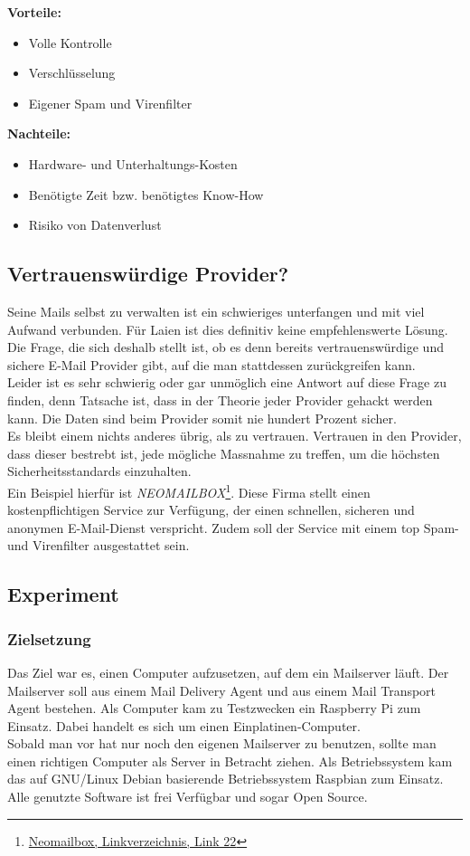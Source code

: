 \textbf{Vorteile:}
\begin{itemize}
    \item Volle Kontrolle
    \item Verschlüsselung
    \item Eigener Spam und Virenfilter
\end{itemize}

\textbf{Nachteile:}
\begin{itemize}
    \item Hardware- und Unterhaltungs-Kosten
    \item Benötigte Zeit bzw. benötigtes Know-How
    \item Risiko von Datenverlust
\end{itemize}

\subsection{Vertrauenswürdige Provider?}
Seine Mails selbst zu verwalten ist ein schwieriges unterfangen und mit viel Aufwand verbunden. Für Laien ist dies definitiv keine empfehlenswerte Lösung. Die Frage, die sich deshalb stellt ist, ob es denn bereits vertrauenswürdige und sichere E-Mail Provider gibt, auf die man stattdessen zurückgreifen kann. \\
Leider ist es sehr schwierig oder gar unmöglich eine Antwort auf diese Frage zu finden, denn Tatsache ist, dass in der Theorie jeder Provider gehackt werden kann. Die Daten sind beim Provider somit nie hundert Prozent sicher. \\
Es bleibt einem nichts anderes übrig, als zu vertrauen. Vertrauen in den Provider, dass dieser bestrebt ist, jede mögliche Massnahme zu treffen, um die höchsten Sicherheitsstandards einzuhalten. \\
Ein Beispiel hierfür ist \textit{NEOMAILBOX}\footnote{\hyperlink{link22}{Neomailbox, Linkverzeichnis, Link 22}}. Diese Firma stellt einen kostenpflichtigen Service zur Verfügung, der einen schnellen, sicheren und anonymen E-Mail-Dienst verspricht. Zudem soll der Service mit einem top Spam- und Virenfilter ausgestattet sein.

\subsection{Experiment}

\subsubsection{Zielsetzung}
Das Ziel war es, einen Computer aufzusetzen, auf dem ein Mailserver läuft. Der Mailserver soll aus einem Mail Delivery Agent und aus einem Mail Transport Agent bestehen.
Als Computer kam zu Testzwecken ein Raspberry Pi zum Einsatz. Dabei handelt es sich um einen Einplatinen-Computer. \\
Sobald man vor hat nur noch den eigenen Mailserver zu benutzen, sollte man einen richtigen Computer als Server in Betracht ziehen. Als Betriebssystem kam das auf GNU/Linux Debian basierende Betriebssystem Raspbian zum Einsatz.
Alle genutzte Software ist frei Verfügbar und sogar Open Source.

